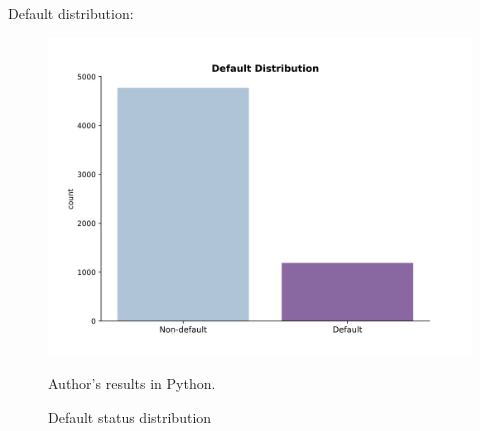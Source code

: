 Default distribution:

\begin{figure}[H]
    \begin{center}
    \caption{Default status distribution}
    \label{fig:defaultdist}
    \includegraphics[width=150mm]{Figures/Default_Distribution.jpg}
\end{center}
\begin{center}
    \begin{source}Author's results in Python.\end{source}
    \end{center}
\end{figure}

